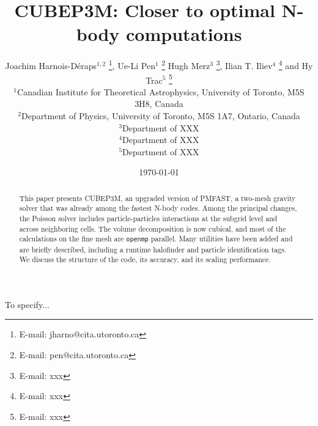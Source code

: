 \documentclass[useAMS,usenatbib]{mn2e}
\title[{\small} CUBEP3M: Closer to optimal N-body computations]{{\small} CUBEP3M: Closer to optimal N-body computations}
\author[Joachim Harnois-D\'{e}raps, Ue-Li Pen, Hugh Merz, Ilian T. Iliev, Hy Trac]{Joachim Harnois-D\'{e}raps$^{1,2}$ 
\thanks{E-mail: jharno@cita.utoronto.ca},  Ue-Li Pen$^{1}$ \thanks{E-mail: pen@cita.utoronto.ca} 
Hugh Merz$^{3}$ \thanks{E-mail: xxx},  Ilian T. Iliev$^{4}$ \thanks{E-mail: xxx} and
Hy Trac$^{5}$ \thanks{E-mail: xxx}\\
$^{1}$Canadian Institute for Theoretical Astrophysics, University of
Toronto, M5S 3H8, Canada\\
$^{2}$Department of Physics, University of Toronto, M5S 1A7, Ontario,  Canada\\
$^{3}$Department of XXX\\
$^{4}$Department of XXX\\
$^{5}$Department of XXX}
\begin{document}
\date{\today}

\pagerange{\pageref{firstpage}--\pageref{lastpage}} 

\maketitle

\label{firstpage}

\begin{abstract}
This paper presents {\small CUBEP3M}, an upgraded version of {\small PMFAST}, 
a two-mesh gravity solver that was already among the fastest N-body codes. 
Among the principal changes, the Poisson solver includes particle-particles interactions
at the subgrid level and across neighboring cells. The volume decomposition is now cubical,
and most of the calculations on the fine mesh are {\tt openmp} parallel.
Many utilities have been added and are briefly described, including a runtime halofinder
and particle identification tags. 
We discuss the structure of the code, its accuracy, and  its scaling performance.
\end{abstract}

\begin{keywords}
To specify...
\end{keywords}







%


%

{}
%

\bsp

\label{lastpage}
\end{document}
